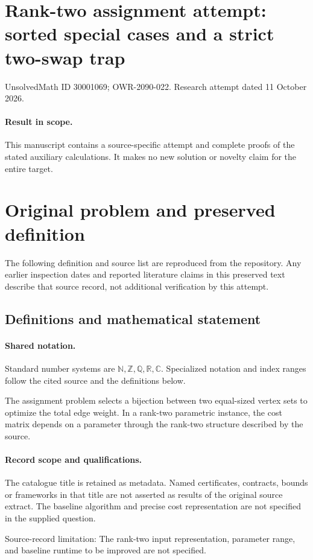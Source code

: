 \documentclass[11pt]{article}
\begin{document}
\section*{Rank-two assignment attempt: sorted special cases and a strict two-swap trap}
\noindent UnsolvedMath ID 30001069; OWR-2090-022. Research attempt dated 11 October 2026.
\paragraph{Result in scope.}This manuscript contains a source-specific attempt and complete proofs of the stated auxiliary calculations. It makes no new solution or novelty claim for the entire target.
\section{Original problem and preserved definition}
The following definition and source list are reproduced from the repository. Any earlier inspection dates and reported literature claims in this preserved text describe that source record, not additional verification by this attempt.
\subsection{Definitions and mathematical statement}

\paragraph{Shared notation.}Standard number systems are $\mathbb N,\mathbb Z,\mathbb Q,\mathbb R,\mathbb C$. Specialized notation and index ranges follow the cited source and the definitions below.


The assignment problem selects a bijection between two equal-sized vertex sets to optimize the total edge weight. In a rank-two parametric instance, the cost matrix depends on a parameter through the rank-two structure described by the source.
\paragraph{Record scope and qualifications.}
The catalogue title is retained as metadata. Named certificates, contracts, bounds or frameworks in that title are not asserted as results of the original source extract.
The baseline algorithm and precise cost representation are not specified in the supplied question.

Source-record limitation: The rank-two input representation, parameter range, and baseline runtime to be improved are not specified.
\end{document}
